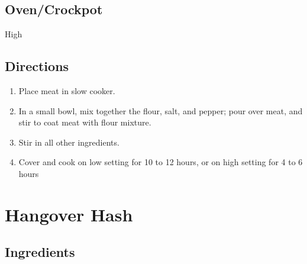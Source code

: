 \documentclass[ansiapaper,10pt,english]{sphinxmanual}
\begin{document}
\section{Oven/Crockpot}
\label{\detokenize{Crockpot_Beef_Stew:oven-crockpot}}
High


\section{Directions}
\label{\detokenize{Crockpot_Beef_Stew:directions}}\begin{enumerate}
\item {} 
Place meat in slow cooker.

\item {} 
In a small bowl, mix together the flour, salt, and pepper; pour over meat, and stir to coat meat with flour mixture.

\item {} 
Stir in all other ingredients.

\item {} 
Cover and cook on low setting for 10 to 12 hours, or on high setting for 4 to 6 hours

\end{enumerate}


\chapter{Hangover Hash}
\label{\detokenize{Hangover_Hash:hangover-hash}}\label{\detokenize{Hangover_Hash::doc}}

\section{Ingredients}
\label{\detokenize{Hangover_Hash:ingredients}}
%
\begin{sphinxVerbatim}[commandchars=\\\{\}]
      

       

    

   

   
\end{sphinxVerbatim}
\end{document}
